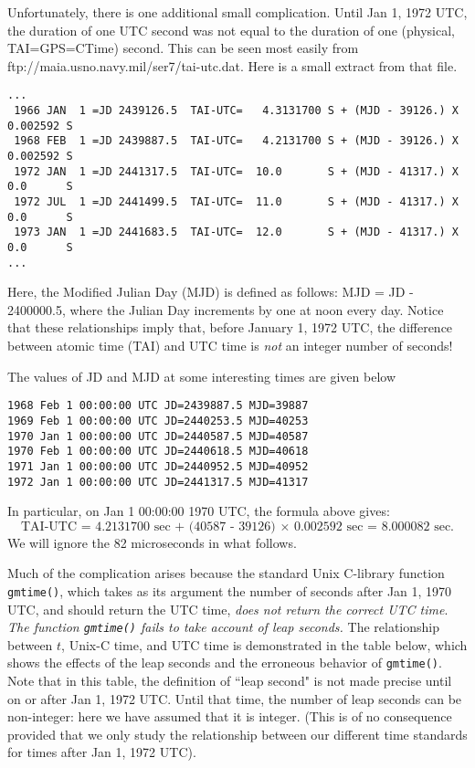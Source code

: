 Unfortunately, there is one additional small complication.  Until Jan 1, 1972 UTC,
the duration of one UTC second was not equal to the duration of one (physical,
TAI=GPS=CTime) second.  This can be seen most easily from
{ftp://maia.usno.navy.mil/ser7/tai-utc.dat}.  Here is a small extract from that
file.
\begin{verbatim}
...
 1966 JAN  1 =JD 2439126.5  TAI-UTC=   4.3131700 S + (MJD - 39126.) X 0.002592 S
 1968 FEB  1 =JD 2439887.5  TAI-UTC=   4.2131700 S + (MJD - 39126.) X 0.002592 S
 1972 JAN  1 =JD 2441317.5  TAI-UTC=  10.0       S + (MJD - 41317.) X 0.0      S
 1972 JUL  1 =JD 2441499.5  TAI-UTC=  11.0       S + (MJD - 41317.) X 0.0      S
 1973 JAN  1 =JD 2441683.5  TAI-UTC=  12.0       S + (MJD - 41317.) X 0.0      S
...
\end{verbatim}
Here, the Modified Julian Day (MJD) is defined as follows: MJD = JD - 2400000.5,
where the Julian Day increments by one at noon every day.
Notice that these relationships imply that, before January 1, 1972 UTC, the difference
between atomic time (TAI) and UTC time is {\it not} an integer number of seconds!

The values of JD and
MJD at some interesting times are given below
\begin{verbatim}  
1968 Feb 1 00:00:00 UTC JD=2439887.5 MJD=39887
1969 Feb 1 00:00:00 UTC JD=2440253.5 MJD=40253
1970 Jan 1 00:00:00 UTC JD=2440587.5 MJD=40587
1970 Feb 1 00:00:00 UTC JD=2440618.5 MJD=40618
1971 Jan 1 00:00:00 UTC JD=2440952.5 MJD=40952
1972 Jan 1 00:00:00 UTC JD=2441317.5 MJD=41317
\end{verbatim}  
In particular, on Jan 1 00:00:00 1970 UTC, the formula above gives:
\begin{equation}
\label{e:startleap}
\textrm{TAI-UTC = 4.2131700 sec + (40587 - 39126) } \times \textrm{ 0.002592 sec = 8.000082 sec.}
\end{equation}
We will ignore the 82 microseconds in what follows.

Much of the complication arises because the standard Unix C-library
function {\tt gmtime()}, which takes as its argument the number of
seconds after Jan 1, 1970 UTC, and should return the UTC time, {\it does
not return the correct UTC time}. {\it The function {\tt gmtime()} fails
to take account of leap seconds.} The relationship between $t$, Unix-C
time, and UTC time is demonstrated in the table below, which shows the
effects of the leap seconds and the erroneous behavior of {\tt gmtime()}.
Note that in this table, the definition of ``leap second" is not made
precise until on or after Jan 1, 1972 UTC.  Until that time, the number of
leap seconds can be non-integer: here we have assumed that it is integer.
(This is of no consequence provided that we only study the relationship between
our different time standards for times after Jan 1, 1972 UTC).

